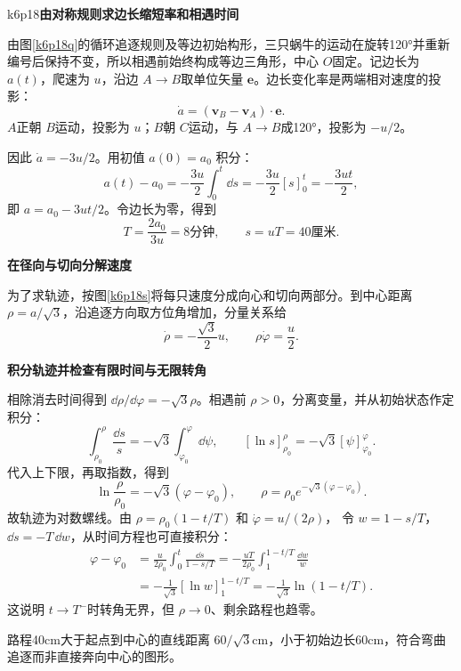 \begin{drillsolution}{k6p18}\textbf{由对称规则求边长缩短率和相遇时间}\par\nobreak
由图\ref{k6p18q}的循环追逐规则及等边初始构形，三只蜗牛的运动在旋转120°并重新编号后保持不变，所以相遇前始终构成等边三角形，中心 $O$固定。记边长为 $a(t)$，爬速为 $u$，沿边 $A\to B$取单位矢量 $\bm e$。边长变化率是两端相对速度的投影：
\[\dot a=(\bm v_B-\bm v_A)\cdot\bm e.
\]
$A$正朝 $B$运动，投影为 $u$；$B$朝 $C$运动，与 $A\to B$成120°，投影为 $-u/2$。

因此 $\dot a=-3u/2$。用初值 $a(0)=a_0$ 积分：
\[
a(t)-a_0=-\frac{3u}{2}\int_0^t\dd s
=-\frac{3u}{2}[s]_0^t=-\frac{3ut}{2},
\]
即 $a=a_0-3ut/2$。令边长为零，得到
\[\boxed{T=\frac{2a_0}{3u}=8\text{分钟}},\qquad
\boxed{s=uT=40\text{厘米}}.
\]



\par\medskip{}\noindent\textbf{在径向与切向分解速度}\par\nobreak
为了求轨迹，按图\ref{k6p18s}将每只速度分成向心和切向两部分。到中心距离 $\rho=a/\sqrt3$，沿追逐方向取方位角增加，分量关系给
\[\dot\rho=-\frac{\sqrt3}2u,\qquad \rho\dot\varphi=\frac u2.
\]


\par\medskip{}\noindent\textbf{积分轨迹并检查有限时间与无限转角}\par\nobreak
相除消去时间得到 $\dd\rho/\dd\varphi=-\sqrt3\rho$。相遇前 $\rho>0$，分离变量，并从初始状态作定积分：
\[
\int_{\rho_0}^{\rho}\frac{\dd s}{s}
=-\sqrt3\int_{\varphi_0}^{\varphi}\dd\psi,\qquad
[\ln s]_{\rho_0}^{\rho}=-\sqrt3[\psi]_{\varphi_0}^{\varphi}.
\]
代入上下限，再取指数，得到
\[
\ln\frac\rho{\rho_0}=-\sqrt3(\varphi-\varphi_0),\qquad
\boxed{\rho=\rho_0e^{-\sqrt3(\varphi-\varphi_0)}}.
\]
故轨迹为对数螺线。由 $\rho=\rho_0(1-t/T)$ 和 $\dot\varphi=u/(2\rho)$，
令 $w=1-s/T$，$\dd s=-T\,\dd w$，从时间方程也可直接积分：
\begin{align*}
\varphi-\varphi_0
&=\frac{u}{2\rho_0}\int_0^t\frac{\dd s}{1-s/T}
=-\frac{uT}{2\rho_0}\int_1^{1-t/T}\frac{\dd w}{w}\\
&=-\frac1{\sqrt3}[\ln w]_1^{1-t/T}
=-\frac1{\sqrt3}\ln(1-t/T).
\end{align*}
这说明 $t\to T^-$时转角无界，但 $\rho\to0$、剩余路程也趋零。

路程40cm大于起点到中心的直线距离 $60/\sqrt3$cm，小于初始边长60cm，符合弯曲追逐而非直接奔向中心的图形。\end{drillsolution}
